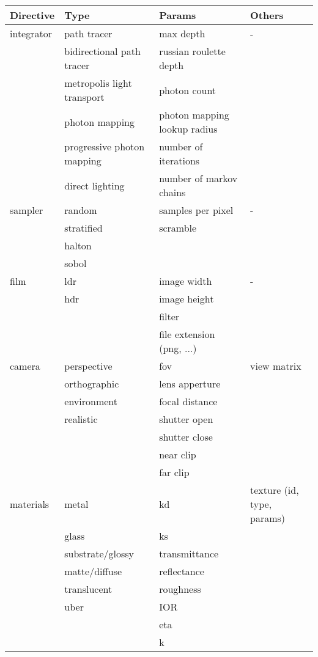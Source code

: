 \begin{center}
    \begin{tabular}{ l | l | l | l }
    \hline
    Directive 		& Type 				& Params 			& Others		\\ \hline
    integrator		& path tracer 			& max depth 			& -			\\
			& bidirectional path tracer 	& russian roulette depth	&			\\
			& metropolis light transport	& photon count			&			\\
			& photon mapping		& photon mapping lookup radius	&			\\
			& progressive photon mapping	& number of iterations		&			\\
			& direct lighting		& number of markov chains	&			\\ \hline
    sampler		& random			& samples per pixel		& -			\\
			& stratified			& scramble			&			\\
			& halton			&				&			\\
			& sobol				&				&			\\ \hline
    film		& ldr				& image width			& -			\\
			& hdr				& image height			&			\\
			&				& filter			&			\\
			&				& file extension (png, ...) 	&			\\ \hline
    camera		& perspective			& fov				& view matrix		\\
			& orthographic			& lens apperture		&			\\
			& environment			& focal distance		&			\\
			& realistic			& shutter open			&			\\
			&				& shutter close			&			\\
			&				& near clip			&			\\
			&				& far clip			&			\\ \hline
    materials		& metal				& kd				& texture (id, type, params)	\\ 
			& glass				& ks				&			\\
			& substrate/glossy		& transmittance			&			\\
			& matte/diffuse			& reflectance			&			\\
			& translucent			& roughness			&			\\
			& uber				& IOR				&			\\
			&				& eta				&			\\
			&				& k				&			\\

\end{tabular}
\end{center}
